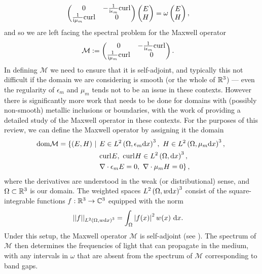 \begin{align*}
	\begin{pmatrix}
		0 & -\frac{1}{\mathrm{i}\epsilon_m}\mathrm{curl}_{} \\
		\frac{1}{\mathrm{i}\mu_m}\mathrm{curl}_{} & 0
	\end{pmatrix}
	\begin{pmatrix} E \\ H	\end{pmatrix}
	&=
	\omega	\begin{pmatrix}	E \\ H	\end{pmatrix},
\end{align*}
and so we are left facing the spectral problem for the Maxwell operator 
\begin{align*}
	\mathcal{M} &:=
	\begin{pmatrix}
		0 & -\frac{1}{\mathrm{i}\epsilon_m}\mathrm{curl}_{} \\
		\frac{1}{\mathrm{i}\mu_m}\mathrm{curl}_{} & 0
	\end{pmatrix}.
\end{align*}
In defining $\mathcal{M}$ we need to ensure that it is self-adjoint, and typically this not difficult if the domain we are considering is smooth (or the whole of $\mathbb{R}^3$) --- even the regularity of $\epsilon_m$ and $\mu_m$ tends not to be an issue in these contexts.
However there is significantly more work that needs to be done for domains with (possibly non-smooth) metallic inclusions or boundaries, with the work of  providing a detailed study of the Maxwell operator in these contexts.
For the purposes of this review, we can define the Maxwell operator by assigning it the domain
\begin{align*}
	\mathrm{dom}{\mathcal{M}} = \left\{ \left( E,H \right) \ \middle\vert \right. 
	&
	\left. E\in L^2\left( \Omega, \epsilon_m\mathrm{d} x \right)^3, \ H\in L^2\left( \Omega, \mu_m\mathrm{d} x \right)^3, \right. \\
	&
	\left. \mathrm{curl}_{}E, \ \mathrm{curl}_{}H\in L^{2}\left( \Omega,\mathrm{d}x \right)^3, \right. \\
	&
	\left. \nabla\cdot \epsilon_m E = 0, \ \nabla\cdot \mu_m H = 0 \right\},
\end{align*}
where the derivatives are understood in the weak (or distributional) sense, and $\Omega\subset\mathbb{R}^3$ is our domain.
The weighted spaces $L^2\left( \Omega, w\mathrm{d} x \right)^3$ consist of the square-integrable functions $f:\mathbb{R}^3\rightarrow\mathbb{C}^3$ equipped with the norm
\begin{align*}
	\lvert\lvert  f  \rvert\rvert_{L^2\left( \Omega, w\mathrm{d} x \right)^3} &= \int_{\Omega}\left\lvert f(x) \right\rvert^2 w(x) \ \mathrm{d}x.
\end{align*}
Under this setup, the Maxwell operator $\mathcal{M}$ is self-adjoint (see ).
The spectrum of $\mathcal{M}$ then determines the frequencies of light that can propagate in the medium, with any intervals in $\omega$ that are absent from the spectrum of $\mathcal{M}$ corresponding to band gaps.

